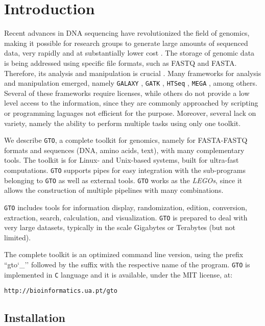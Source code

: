 \chapter{Introduction}
\label{intro}

Recent advances in {DNA} sequencing have revolutionized the field of genomics, making it possible for research groups to generate large amounts of sequenced data, very rapidly and at substantially lower cost \cite{Mardis-2017a}. The storage of genomic data is being addressed using specific file formats, such as FASTQ and FASTA. Therefore, its analysis and manipulation is crucial \cite{Buermans-2014a}. Many frameworks for analysis and manipulation emerged, namely \texttt{GALAXY} \cite{Giardine-2005a}, \texttt{GATK} \cite{DePristo-2011a}, \texttt{HTSeq} \cite{Anders-2014a}, \texttt{MEGA} \cite{Kumar-2016a}, among others. Several of these frameworks require licenses, while others do not provide a low level access to the information, since they are commonly approached
by scripting or programming laguages not efficient for the purpose. Moreover, several lack on variety, namely the ability to perform multiple tasks using only one toolkit.

We describe \texttt{GTO}, a complete toolkit for genomics, namely for FASTA-FASTQ formats and sequences (DNA, amino acids, text), with many complementary tools. The toolkit is for Linux- and Unix-based systems, built for ultra-fast computations. \texttt{GTO} supports pipes for easy integration with the sub-programs belonging to \texttt{GTO} as well as external tools. \texttt{GTO} works as the \textit{LEGOs}, since it allows the construction of multiple pipelines with many combinations.

\texttt{GTO} includes tools for information display, randomization, edition, conversion, extraction, search, calculation, and visualization. \texttt{GTO} is prepared to deal with very large datasets, typically in the scale Gigabytes or Terabytes (but not limited).

The complete toolkit is an optimized command line version, using the prefix ``gto\char`_'' followed by the suffix with the respective name of the program. \texttt{GTO} is implemented in \texttt{C} language and it is available, under the MIT license, at:
\begin{lstlisting}
http://bioinformatics.ua.pt/gto
\end{lstlisting}

\section{Installation}

